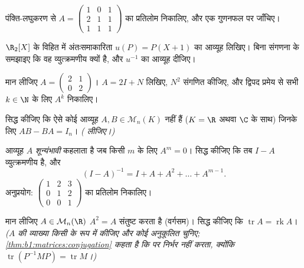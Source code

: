 \begin{exercise}[$\star$]\label{exo:b1:matrices:3}
पंक्ति-लघुकरण से $A = \begin{pmatrix} 1 & 0 & 1\\ 2 & 1 & 1\\ 1 & 1 & 1
\end{pmatrix}$ का प्रतिलोम निकालिए, और एक गुणनफल पर जाँचिए।
\end{exercise}

\begin{exercise}[$\star$]\label{exo:b1:matrices:4}
$\R_2[X]$ के विहित  में अंतःसमाकारिता $u(P) = P(X + 1)$ का आव्यूह लिखिए।
बिना संगणना के समझाइए कि वह व्युत्क्रमणीय क्यों है, और $u^{-1}$ का आव्यूह
दीजिए।
\end{exercise}

\begin{exercise}[$\star\star$]\label{exo:b1:matrices:5}
मान लीजिए $A = \begin{pmatrix} 2 & 1 \\ 0 & 2\end{pmatrix}$। $A = 2I + N$
लिखिए, $N^2$ संगणित कीजिए, और द्विपद प्रमेय से सभी $k \in \N$ के लिए $A^k$
निकालिए।
\end{exercise}

\begin{exercise}[$\star\star$]\label{exo:b1:matrices:6}
सिद्ध कीजिए कि ऐसे कोई आव्यूह $A, B \in \mathcal{M}_n(K)$ नहीं हैं ($K = \R$
अथवा $\C$ के साथ) जिनके लिए $AB - BA = I_n$। \emph{( लीजिए।)}
\end{exercise}

\begin{exercise}[$\star\star$]\label{exo:b1:matrices:7}
आव्यूह $A$ \emph{शून्यंभावी} कहलाता है जब किसी $m$ के लिए $A^m = 0$। सिद्ध
कीजिए कि तब $I - A$ व्युत्क्रमणीय है, और
\[
(I - A)^{-1} = I + A + A^2 + \dots + A^{m-1} .
\]
अनुप्रयोग: $\begin{pmatrix} 1 & 2 & 3\\ 0 & 1 & 2\\ 0 & 0 & 1\end{pmatrix}$
का प्रतिलोम निकालिए।
\end{exercise}

\begin{exercise}[$\star\star$]\label{exo:b1:matrices:8}
मान लीजिए $A \in \mathcal{M}_n(\R)$ $A^2 = A$ संतुष्ट करता है (वर्गसम)।
सिद्ध कीजिए कि $\operatorname{tr} A = \operatorname{rk} A$। \emph{($A$ की
व्याख्या किसी  के रूप में कीजिए और कोई अनुकूलित  चुनिए;
\cref{thm:b1:matrices:conjugation} कहता है कि   पर निर्भर नहीं
करता, क्योंकि $\operatorname{tr}(P^{-1}MP) = \operatorname{tr} M$।)}
\end{exercise}

